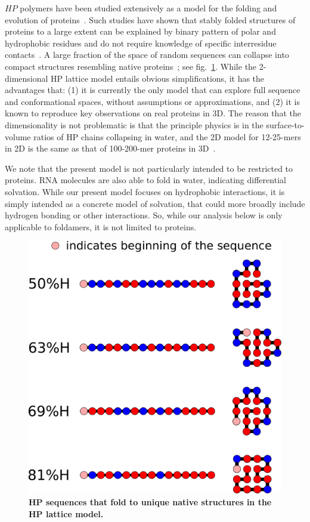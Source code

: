 \documentclass[journal=jacsat,manuscript=article,layout=twocolumn]{achemso}
\begin{document}
 $HP$ polymers have been studied extensively as a model for the folding and evolution of 
 proteins~\cite{lau1989lattice,Chan1991,Miller1995,Yue1995,agarwala1997local}.  Such studies have 
shown that stably folded structures of proteins to a large extent can be explained by binary 
pattern 
of polar and hydrophobic residues and do not require knowledge of specific interresidue 
contacts~\cite{Yue1992,Xiong1995,Fisher2011}. A large fraction of the space of random sequences can 
collapse into compact structures resembling native proteins~\cite{lau1989lattice}; see 
fig.~\ref{fig:hydro-effect}.  While the 2-dimensional HP lattice model entails obvious 
simplifications, it has the advantages that: (1) it is currently the only model that can explore 
full sequence and conformational spaces, without assumptions or approximations, and (2) it is known 
to reproduce key observations on real proteins in 3D.  The reason that the dimensionality is not 
problematic is that the principle physics is in the surface-to-volume ratios of HP chains 
collapsing 
in water, and the 2D model for 12-25-mers in 2D is the same as that of 100-200-mer proteins in 
3D~\cite{Giugliarelli2000}. 
 
  We note that the present model is not particularly intended to be restricted to proteins.  
  RNA molecules are also able to fold in water, indicating differential solvation.  While our 
present model focuses on hydrophobic interactions, it is simply intended as a concrete model of 
solvation, that could more broadly include hydrogen bonding or other interactions.  So, while our 
analysis below is only applicable to foldamers, it is not limited to proteins.
 

\begin{figure}[h!]
  \centering
  \includegraphics[width=\columnwidth]{pictures/tst-seqs.pdf} 
  \caption{\footnotesize{\textbf{HP sequences that fold to unique native structures in the HP 
lattice model.}}}
  \label{fig:hydro-effect}
\end{figure}
\end{document}
